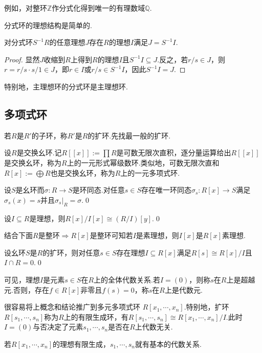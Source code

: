 例如，对整环$\mathbb{Z}$作分式化得到唯一的有理数域$\mathbb{Q}$.

分式环的理想结构是简单的.
\begin{prop}
    对分式环$S^{-1}R$的任意理想$J$存在$R$的理想$I$满足$J=S^{-1}I$.
\end{prop}
\begin{proof}
    显然$J$收缩到$R$上得到$R$的理想$I$且$S^{-1}I\subseteq J$.反之，若$r/s\in J$，则$r=r/s\cdot s/1\in J$，即$r\in I$或$r/s\in S^{-1}I$，因此$S^{-1}I=J$.
\end{proof}

特别地，主理想环的分式环是主理想环.

\subsection{多项式环}
若$R$是$R'$的子环，称$R'$是$R$的{\heiti 扩环}.先找最一般的扩环.

设$R$是交换幺环.记$R[[x]]:=\prod R$是可数无限次直积，逐分量运算给出$R[[x]]$是交换幺环，称为$R$上的{\heiti 一元形式幂级数环}.类似地，可数无限次直和$R[x]:=\bigoplus R$也是交换幺环，称为$R$上的{\heiti 一元多项式环}.

\begin{prop}
    设$S$是幺环而$\sigma\colon R\to S$是环同态.对任意$s\in S$存在唯一环同态$\sigma_s\colon R[x]\to S$满足$\sigma_s(x)=s$并且$\sigma_s|_R=\sigma$.\qed
\end{prop}
\begin{cor*}
    设$I\subseteq R$是理想，则$R[x]/I[x]\cong(R/I)[y]$.\qed
\end{cor*}
\begin{remark}
    结合下面$R$是整环$\Rightarrow R[x]$是整环可知若$I$是素理想，则$I[x]$是$R[x]$素理想.
\end{remark}
\begin{cor*}
    设幺环$S$是$R$的扩环，则对任意$s\in S$存在理想$I\subseteq R[x]$满足$R[s]\cong R[x]/I$且$I\cap R=0$.\qed
\end{cor*}

可见，理想$I$是元素$s\in S$在$R$上的全体代数关系.若$I=(0)$，则称$s$在$R$上是{\heiti 超越元}.否则，存在$f\in R[x]$非零且$f(s)=0$，称$s$在$R$上是{\heiti 代数元}.

很容易将上概念和结论推广到{\heiti 多元多项式环} $R[x_1,\cdots,x_n]$.特别地，扩环$R[s_1,\cdots,s_n]$称为$R$上的{\heiti 有限生成环}，有$R[s_1,\cdots,s_n]\cong R[x_1,\cdots,x_n]/I$.此时$I=(0)$与否决定了元素$s_1,\cdots,s_n$是否在$R$上{\heiti 代数无关}.

若$R[x_1,\cdots,x_n]$的理想有限生成，$s_1,\cdots,s_n$就有基本的代数关系.

